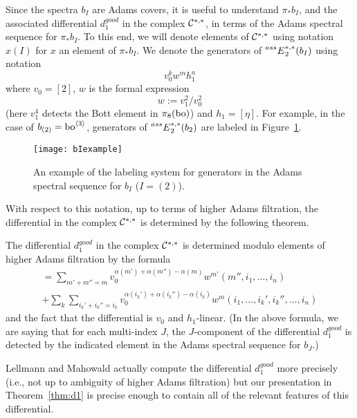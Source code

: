 Since the spectra $b_I$ are Adams covers, it is useful to understand $\pi_* b_I$, and the associated differential $d_1^{good}$ in the complex $\mathcal{C}^{*,*}$, in terms of the Adams spectral sequence for $\pi_* b_I$.
To this end, we will denote elements of $\mathcal{C}^{*,*}$
using notation
$ x(I)$
for $x$ an element of $\pi_* b_I$.  
We denote the generators of $\prescript{ass}{}{E}_2^{*,*}(b_I)$
using notation
$$ v_0^k w^m h_1^a $$
where $v_0 = [2]$, $w$ is the formal expression 
$$ w := v_1^2/v_0^2 $$
(here $v_1^4$ detects the Bott element in $\pi_8(\mathrm{bo})$) and $h_1 = [\eta]$.
For example, in the case of $b_{(2)} = \mathrm{bo}^{\langle 3 \rangle}$, generators of $\prescript{ass}{}{E}_2^{*,*}(b_{2})$ are labeled in Figure~\ref{fig:bIexample}.
\begin{figure}
\centering
\texttt{[image: bIexample]}
\caption{An example of the labeling system for generators in the Adams spectral sequence for $b_I$ ($I=(2)$).}
\label{fig:bIexample}
\end{figure}
With respect to this notation, up to terms of higher Adams filtration, the differential in the complex $\mathcal{C}^{*,*}$ is determined by the following theorem. 


\begin{thm}\label{thm:d1}
	The differential $d_1^{good}$ in the complex $\mathcal{C}^{*,*}$ is determined modulo elements of higher Adams filtration by the formula
	\begin{multline*}
	 [d_1^{good}(w^m(i_1, \ldots, i_n))] = \sum_{m' + m'' = m} v_0^{\alpha(m')+\alpha(m'')-\alpha(m)} w^{m'}(m'', i_1, \ldots, i_n) \\ + 
	\sum_k \sum_{i_k'+i_k'' = i_k} v_0^{\alpha(i_k') + \alpha(i_k'')-\alpha(i_k)} w^m(i_1, \ldots, i_k', i_k'', \ldots, i_n) \end{multline*}
	and the fact that the differential is $v_0$ and $h_1$-linear.  (In the above formula, we are saying that for each multi-index $J$, the $J$-component of the differential $d_1^{good}$ is detected by the indicated element in the Adams spectral sequence for $b_J$.)
\end{thm}

\begin{rmk}
	Lellmann and Mahowald actually compute the differential $d_1^{good}$ more precisely (i.e., not up to ambiguity of higher Adams filtration) but our presentation in Theorem~\ref{thm:d1} is precise enough to contain all of the relevant features of this differential.
\end{rmk}

